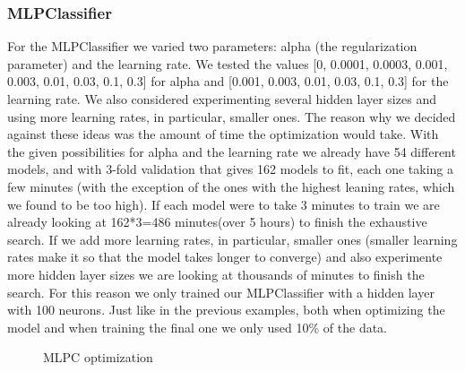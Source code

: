 \documentclass[12pt]{article}
\begin{document}
        
\subsubsection{MLPClassifier}
\label{subsubsection.mlpc_tunning}
    \par 
        For the MLPClassifier we varied two parameters: alpha (the regularization parameter) and the learning rate. We tested the values 
        [0, 0.0001, 0.0003, 0.001, 0.003, 0.01, 0.03, 0.1, 0.3] for alpha and [0.001, 0.003, 0.01, 0.03, 0.1, 0.3] for the learning rate.
        We also considered experimenting several hidden layer sizes\cite{nn_faq} and using more learning rates, in particular, smaller ones.
        The reason why we decided against these ideas was the amount of time the optimization would take. With the given possibilities for 
        alpha and the learning rate we already have 54 different models, and with 3-fold validation that gives 162 models to fit, each one 
        taking a few minutes (with the exception of the ones with the highest leaning rates, which we found to be too high). If each model 
        were to take 3 minutes to train we are already looking at 162*3=486 minutes(over 5 hours) to finish the exhaustive search. If we add 
        more learning rates, in particular, smaller ones (smaller learning rates make it so that the model takes longer to converge) and also 
        experimente more hidden layer sizes we are looking at thousands of minutes to finish the search. For this reason we only trained our 
        MLPClassifier with a hidden layer with 100 neurons. Just like in the previous examples, both when optimizing the model and when 
        training the final one we only used 10\% of the data.

    \begin{figure}[!tb]
        \caption{MLPC optimization}
        \label{img_nn_opti}
    \end{figure}
\end{document}
